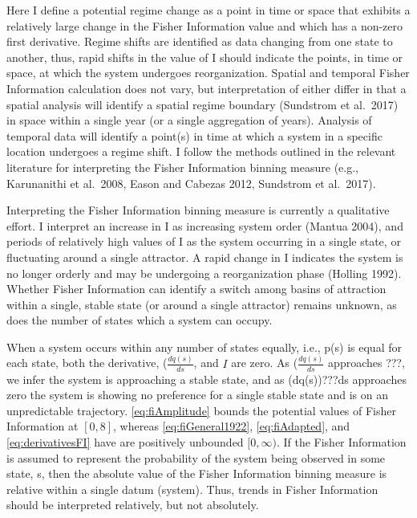 \documentclass[12pt,twoside]{reedthesis}
\begin{document}
Here I define a potential regime change as a point in time or space that exhibits a relatively large change in the Fisher Information value and which has a non-zero first derivative. Regime shifts are identified as data changing from one state to another, thus, rapid shifts in the value of I should indicate the points, in time or space, at which the system undergoes reorganization. Spatial and temporal Fisher Information calculation does not vary, but interpretation of either differ in that a spatial analysis will identify a spatial regime boundary (Sundstrom et al.~2017) in space within a single year (or a single aggregation of years). Analysis of temporal data will identify a point(s) in time at which a system in a specific location undergoes a regime shift. I follow the methods outlined in the relevant literature for interpreting the Fisher Information binning measure (e.g., Karunanithi et al.~2008, Eason and Cabezas 2012, Sundstrom et al.~2017).

Interpreting the Fisher Information binning measure is currently a qualitative effort. I interpret an increase in I as increasing system order (Mantua 2004), and periods of relatively high values of I as the system occurring in a single state, or fluctuating around a single attractor. A rapid change in I indicates the system is no longer orderly and may be undergoing a reorganization phase (Holling 1992). Whether Fisher Information can identify a switch among basins of attraction within a single, stable state (or around a single attractor) remains unknown, as does the number of states which a system can occupy.

When a system occurs within any number of states equally, i.e., p(s) is equal for each state, both the derivative, (\(\frac{dq(s)}{ds}\), and \(I\) are zero. As (\(\frac{dq(s)}{ds}\) approaches ???, we infer the system is approaching a stable state, and as (dq(s))???ds approaches zero the system is showing no preference for a single stable state and is on an unpredictable trajectory. \eqref{eq:fiAmplitude} bounds the potential values of Fisher Information at \([0, 8]\), whereas \eqref{eq:fiGeneral1922}, \eqref{eq:fiAdapted}, and \eqref{eq:derivativesFI} have are positively unbounded \([0, \infty)\). If the Fisher Information is assumed to represent the probability of the system being observed in some state, s, then the absolute value of the Fisher Information binning measure is relative within a single datum (system). Thus, trends in Fisher Information should be interpreted relatively, but not absolutely.
\end{document}
